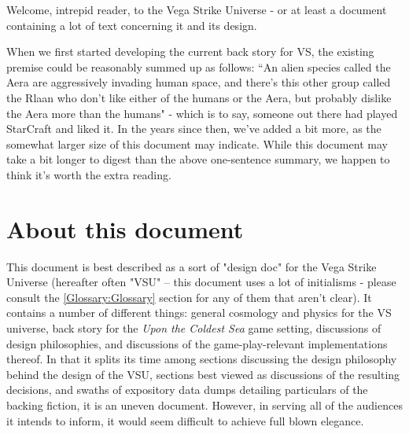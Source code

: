 Welcome, intrepid reader, to the Vega Strike Universe - or at least a
document containing a lot of text concerning it and its design.

When we first started developing the current back story for VS, the
existing premise could be reasonably summed up as follows: ``An alien
species called the Aera are aggressively invading human space, and
there's this other group called the Rlaan who don't like either of the
humans or the Aera, but probably dislike the Aera more than the
humans" - which is to say, someone out there had played StarCraft and
liked it. In the years since then, we've added a bit more, as the
somewhat larger size of this document may indicate. While this
document may take a bit longer to digest than the above one-sentence
summary, we happen to think it's worth the extra reading.

\section*{About this document}
This document is best described as a sort of "design doc" for the Vega
Strike Universe (hereafter often "VSU" -- this document uses a lot
of initialisms - please consult the \ref{Glossary:Glossary} section for any of them
that aren't clear). It contains a number of different things: general
cosmology and physics for the VS universe, back story for the {\it
Upon the Coldest Sea} game setting, discussions of design
philosophies, and discussions of the game-play-relevant implementations thereof. In that
it splits its time among sections discussing the design philosophy
behind the design of the VSU, sections best viewed as discussions of
the resulting decisions, and swaths of expository data dumps detailing
particulars of the backing fiction, it is an uneven document. However,
in serving all of the audiences it intends to inform, it would seem
difficult to achieve full blown elegance.

